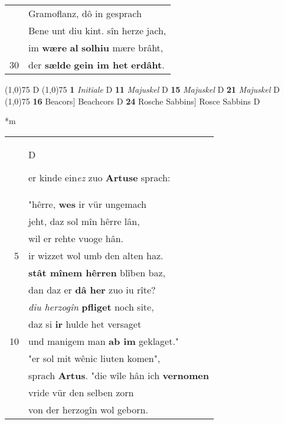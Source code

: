 \documentclass[8pt,a4paper,notitlepage]{article}
\begin{document}
\begin{table}[ht]
\begin{minipage}[t]{0.5\linewidth}
\begin{tabular}{rl}
 & Gramoflanz, dô in gesprach\\ 
 & Bene unt diu kint. sîn herze jach,\\ 
 & im \textbf{wære} \textbf{al} \textbf{solhiu} mære brâht,\\ 
30 & der \textbf{sælde} \textbf{gein im het} \textbf{erdâht}.\\ 
\end{tabular}
\scriptsize
\line(1,0){75} \newline
D \newline
\line(1,0){75} \newline
\textbf{1} \textit{Initiale} D  \textbf{11} \textit{Majuskel} D  \textbf{15} \textit{Majuskel} D  \textbf{21} \textit{Majuskel} D  \newline
\line(1,0){75} \newline
\textbf{16} Beacors] Beachcors D \textbf{24} Rosche Sabbins] Rosce Sabbins D \newline
\end{minipage}
\hspace{0.5cm}
\begin{minipage}[t]{0.5\linewidth}
\small
\begin{center}*m
\end{center}
\begin{tabular}{rl}
 & \begin{large}D\end{large}er kinde ein\textit{ez} zuo \textbf{Artuse} sprach:\\ 
 & "hêrre, \textbf{wes} ir vür ungemach\\ 
 & jeht, daz sol mîn hêrre lân,\\ 
 & wil er rehte vuoge hân.\\ 
5 & ir wizzet wol umb den alten haz.\\ 
 & \textbf{stât mînem hêrren} blîben baz,\\ 
 & dan daz er \textbf{dâ her} zuo iu rîte?\\ 
 & \textit{diu herzogîn} \textbf{pfliget} noch site,\\ 
 & daz si \textbf{ir} hulde het versaget\\ 
10 & und manigem man \textbf{ab im} geklaget."\\ 
 & "er sol mit wênic liuten komen",\\ 
 & sprach \textbf{Artus}. "die wîle hân ich \textbf{vernomen}\\ 
 & vride vür den selben zorn\\ 
 & von der herzogîn wol geborn.\\ 

\end{tabular}
\end{minipage}
\end{table}
\end{document}
